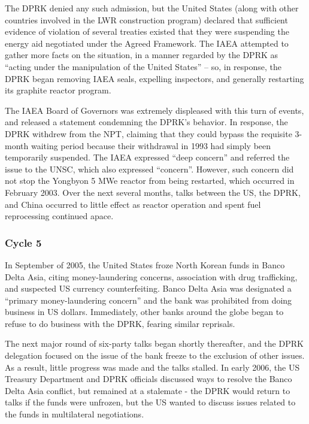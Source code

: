 \documentclass{article}
\begin{document}
The DPRK denied any such admission, but the United States (along with other countries involved in the LWR construction program) declared that sufficient evidence of violation of several treaties existed that they were suspending the energy aid negotiated under the Agreed Framework\cite{iaea09}. The IAEA attempted to gather more facts on the situation, in a manner regarded by the DPRK as “acting under the manipulation of the United States”\cite{hurriyet} – so, in response, the DPRK began removing IAEA seals, expelling inspectors, and generally restarting its graphite reactor program\cite{iaea09}.

The IAEA Board of Governors was extremely displeased with this turn of events, and released a statement condemning the DPRK’s behavior\cite{iaea03}. In response, the DPRK withdrew from the NPT, claiming that they could bypass the requisite 3-month waiting period because their withdrawal in 1993 had simply been temporarily suspended\cite{kcna4}. The IAEA expressed “deep concern” and referred the issue to the UNSC, which also expressed “concern”\cite{iaea09}. However, such concern did not stop the Yongbyon 5 MWe reactor from being restarted, which occurred in February 2003\cite{davenport}. Over the next several months, talks between the US, the DPRK, and China occurred to little effect as reactor operation and spent fuel reprocessing continued apace\cite{davenport}.

\subsubsection{Cycle 5}
In September of 2005, the United States froze North Korean funds in Banco Delta Asia, citing money-laundering concerns, association with drug trafficking, and suspected US currency counterfeiting\cite{davenport}. Banco Delta Asia was designated a “primary money-laundering concern” and the bank was prohibited from doing business in US dollars. Immediately, other banks around the globe began to refuse to do business with the DPRK, fearing similar reprisals\cite{greenlees}.

The next major round of six-party talks began shortly thereafter, and the DPRK delegation focused on the issue of the bank freeze to the exclusion of other issues\cite{greenlees}. As a result, little progress was made and the talks stalled. In early 2006, the US Treasury Department and DPRK officials discussed ways to resolve the Banco Delta Asia conflict, but remained at a stalemate - the DPRK would return to talks if the funds were unfrozen, but the US wanted to discuss issues related to the funds in multilateral negotiations\cite{greenlees}.
\end{document}
